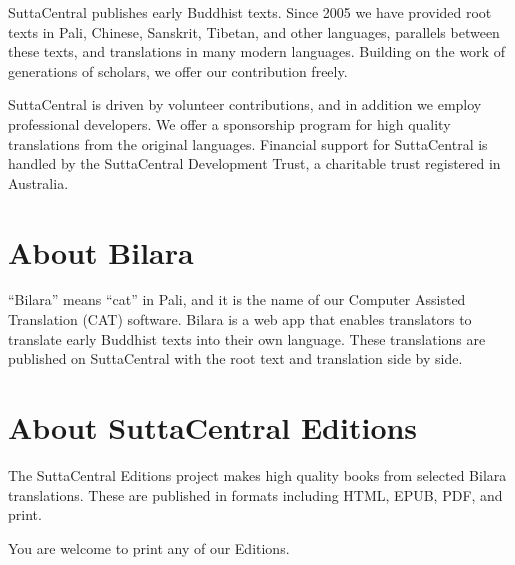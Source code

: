 \documentclass[12pt,openany]{book}%
\begin{document}
SuttaCentral publishes early Buddhist texts. Since 2005 we have provided root texts in Pali, Chinese, Sanskrit, Tibetan, and other languages, parallels between these texts, and translations in many modern languages. Building on the work of generations of scholars, we offer our contribution freely.

SuttaCentral is driven by volunteer contributions, and in addition we employ professional developers. We offer a sponsorship program for high quality translations from the original languages. Financial support for SuttaCentral is handled by the SuttaCentral Development Trust, a charitable trust registered in Australia.

\section*{About Bilara}

“Bilara” means “cat” in Pali, and it is the name of our Computer Assisted Translation (CAT) software. Bilara is a web app that enables translators to translate early Buddhist texts into their own language. These translations are published on SuttaCentral with the root text and translation side by side.

\section*{About SuttaCentral Editions}

The SuttaCentral Editions project makes high quality books from selected Bilara translations. These are published in formats including HTML, EPUB, PDF, and print.

You are welcome to print any of our Editions.

%
\end{document}
